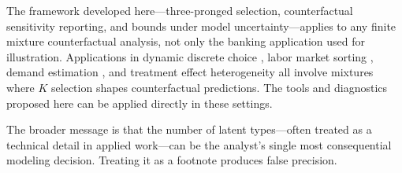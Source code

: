 \documentclass[12pt]{article}
\begin{document}
The framework developed here---three-pronged selection, counterfactual sensitivity reporting, and bounds under model uncertainty---applies to any finite mixture counterfactual analysis, not only the banking application used for illustration. Applications in dynamic discrete choice \citep{arcidiacono2011}, labor market sorting \citep{bonhomme2019}, demand estimation \citep{fox2011}, and treatment effect heterogeneity \citep{heckman1984} all involve mixtures where $K$ selection shapes counterfactual predictions. The tools and diagnostics proposed here can be applied directly in these settings.

The broader message is that the number of latent types---often treated as a technical detail in applied work---can be the analyst's single most consequential modeling decision. Treating it as a footnote produces false precision.



\newpage
\singlespacing


\end{document}
